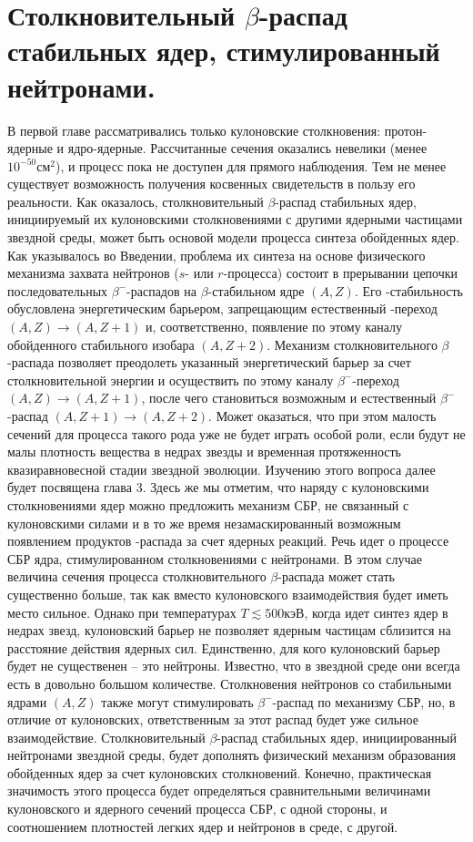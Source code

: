 \chapter{Столкновительный $\beta$-распад стабильных ядер, стимулированный
        нейтронами.}

В первой главе рассматривались только кулоновские столкновения: протон-ядерные и
ядро-ядерные. Рассчитанные сечения оказались невелики (менее
$10^{-50} см^2$), и процесс пока не доступен для прямого наблюдения.
Тем не менее существует возможность получения косвенных свидетельств в пользу
его реальности. Как оказалось, столкновительный $\beta$-распад стабильных ядер,
инициируемый их кулоновскими столкновениями с другими ядерными частицами
звездной среды, может быть основой модели процесса синтеза обойденных ядер.
Как указывалось во Введении, проблема их синтеза на основе физического механизма
захвата нейтронов ($s$- или $r$-процесса)  состоит в прерывании
цепочки последовательных $\beta^-$-распадов на $\beta$-стабильном ядре $(A,Z)$.
Его \be-стабильность обусловлена энергетическим барьером, запрещающим
естественный \be-переход $(A,Z)\to(A,Z+1)$ и, соответственно, появление
по этому каналу обойденного стабильного изобара $(A,Z+2)$.
Механизм столкновительного $\beta$-распада позволяет преодолеть указанный энергетический
барьер за счет столкновительной энергии и осуществить по этому каналу $\beta^-$-переход
$(A,Z) \to (A,Z+1)$, после чего становиться возможным и естественный $\beta^-$-распад
 $(A,Z+1) \to (A,Z+2)$. Может оказаться, что при этом малость сечений
 для процесса такого рода уже не будет играть особой роли, если будут не малы плотность
 вещества в недрах звезды и временная протяженность квазиравновесной стадии
 звездной эволюции.
 Изучению этого вопроса далее будет посвящена глава 3.
 Здесь же мы отметим, что наряду с кулоновскими столкновениями ядер можно предложить
 механизм СБР, не связанный с кулоновскими силами и в то же время незамаскированный
 возможным появлением продуктов \be-распада за счет ядерных реакций.
 Речь идет о процессе СБР ядра, стимулированном столкновениями с нейтронами.
 В этом случае
величина сечения процесса столкновительного $\beta$-распада может стать существенно больше,
так как вместо
кулоновского взаимодействия будет иметь место сильное. Однако при температурах  $T\lesssim 500 кэВ$,
когда идет синтез ядер в недрах звезд, кулоновский барьер не позволяет
ядерным частицам сблизится на расстояние действия ядерных сил. Единственно,
для кого кулоновский барьер будет не существенен -- это нейтроны. Известно, что
в звездной среде они всегда есть в довольно большом количестве.
Столкновения нейтронов  со стабильными ядрами $(A,Z)$ также
могут стимулировать $\beta^-$-распад по механизму СБР, но, в отличие от кулоновских,
ответственным за этот распад будет уже сильное взаимодействие. Столкновительный
$\beta$-распад стабильных ядер, инициированный нейтронами звездной среды,
будет дополнять физический механизм образования обойденных ядер за счет
кулоновских столкновений. Конечно, практическая значимость этого процесса будет
определяться сравнительными величинами кулоновского и ядерного сечений процесса СБР,
с одной стороны, и соотношением плотностей легких ядер и нейтронов в среде, с другой.


